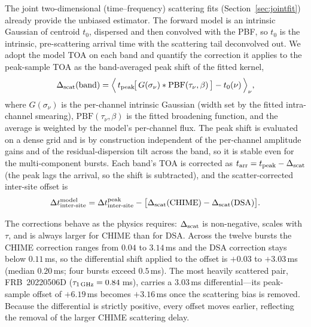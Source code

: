 The joint two-dimensional (time--frequency) scattering fits
(Section~\ref{sec:jointfit}) already provide the unbiased estimator. The
forward model is an intrinsic Gaussian of centroid $t_0$, dispersed and then
convolved with the PBF, so $t_0$ is the intrinsic, pre-scattering arrival time
with the scattering tail deconvolved out. We adopt the model TOA on each band
and quantify the correction it applies to the peak-sample TOA as the
band-averaged peak shift of the fitted kernel,
\begin{equation}
\Delta_{\rm scat}(\mathrm{band}) =
\Big\langle\, t_{\rm peak}\!\big[\,G(\sigma_\nu)\ast \mathrm{PBF}(\tau_\nu,\beta)\,\big]
- t_0(\nu) \,\Big\rangle_\nu ,
\label{eq:scatshift}
\end{equation}
where $G(\sigma_\nu)$ is the per-channel intrinsic Gaussian (width set by the
fitted intra-channel smearing), $\mathrm{PBF}(\tau_\nu,\beta)$ is the fitted
broadening function, and the average is weighted by the model's per-channel
flux. The peak shift is evaluated on a dense grid and is by construction
independent of the per-channel amplitude gains and of the residual-dispersion
tilt across the band, so it is stable even for the multi-component bursts. Each
band's TOA is corrected as $t_{\rm arr} = t_{\rm peak} - \Delta_{\rm scat}$
(the peak lags the arrival, so the shift is subtracted), and the scatter-corrected
inter-site offset is
\begin{equation}
\Delta t_{\rm inter\text{-}site}^{\rm model} =
\Delta t_{\rm inter\text{-}site}^{\rm peak}
- \big[\Delta_{\rm scat}(\mathrm{CHIME}) - \Delta_{\rm scat}(\mathrm{DSA})\big].
\label{eq:offsetcorr}
\end{equation}

The corrections behave as the physics requires: $\Delta_{\rm scat}$ is
non-negative, scales with $\tau$, and is always larger for CHIME than for DSA.
Across the twelve bursts the CHIME correction ranges from $0.04$ to $3.14$\,ms
and the DSA correction stays below $0.11$\,ms, so the differential shift
applied to the offset is $+0.03$ to $+3.03$\,ms (median $0.20$\,ms; four bursts
exceed $0.5$\,ms). The most heavily scattered pair, FRB~20220506D
($\tau_{1\,\rm GHz}=0.84$\,ms), carries a $3.03$\,ms differential---its
peak-sample offset of $+6.19$\,ms becomes $+3.16$\,ms once the scattering bias
is removed. Because the differential is strictly positive, every offset moves
earlier, reflecting the removal of the larger CHIME scattering delay.

